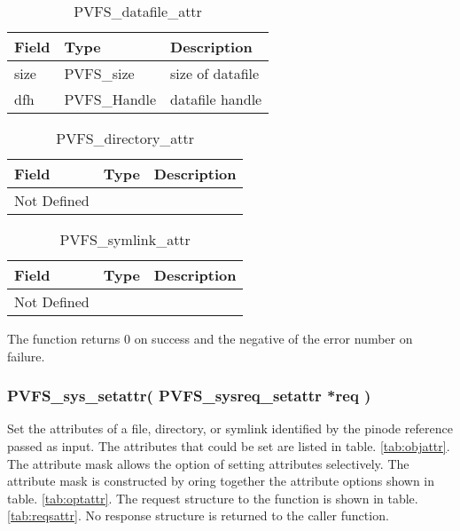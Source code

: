 \documentclass[11pt, letterpaper]{article}
\begin{document}
\begin{table}[H]
\begin{tabular}{|l|l|l|}
\hline
Field & Type & Description \\
\hline
\hline
size & PVFS\_size & size of datafile \\
\hline
dfh & PVFS\_Handle & datafile handle \\
\hline
\end{tabular}
\caption{PVFS\_datafile\_attr}\label{tab:dataattr}
\end{table}

\begin{table}[H]
\begin{tabular}{|l|l|l|}
\hline
Field & Type & Description \\
\hline
\hline
Not Defined &  & \\
\hline
\end{tabular}
\caption{PVFS\_directory\_attr}\label{tab:dirattr}
\end{table}

\begin{table}[H]
\begin{tabular}{|l|l|l|}
\hline
Field & Type & Description \\
\hline
\hline
Not Defined &  & \\
\hline
\end{tabular}
\caption{PVFS\_symlink\_attr}\label{tab:symattr}
\end{table}

The function returns 0 on success and the negative of the error number
on failure.

\subsubsection{PVFS\_sys\_setattr(
PVFS\_sysreq\_setattr *req
)}

Set the attributes of a file, directory, or symlink identified by
the pinode reference passed as input. The attributes that could be set
are listed in table. \ref{tab:objattr}. The attribute mask allows the
option of setting attributes selectively. The attribute mask is
constructed by oring together the attribute options shown in table.
\ref{tab:optattr}. The request structure to the function is shown in
table. \ref{tab:reqsattr}. No response structure is returned to the 
caller function.
\end{document}
